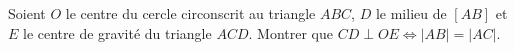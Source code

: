 Soient $O$ le centre du cercle circonscrit au triangle $ABC$, $D$ le milieu de $[AB]$ et $E$ le centre de gravité du triangle $ACD$. Montrer que $CD \perp OE \Leftrightarrow |AB| = |AC|$.
